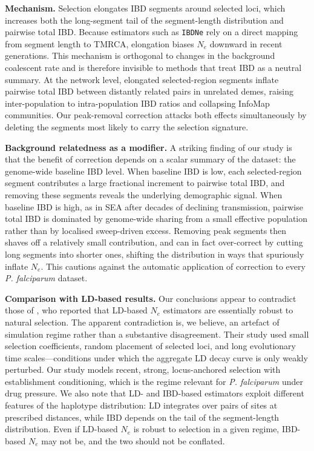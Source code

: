 \documentclass[11pt]{article}
\begin{document}
\textbf{Mechanism.} Selection elongates IBD segments around selected loci, which increases both the long-segment tail of the segment-length distribution and pairwise total IBD. Because estimators such as \texttt{IBDNe} rely on a direct mapping from segment length to TMRCA, elongation biases $N_e$ downward in recent generations. This mechanism is orthogonal to changes in the background coalescent rate and is therefore invisible to methods that treat IBD as a neutral summary. At the network level, elongated selected-region segments inflate pairwise total IBD between distantly related pairs in unrelated demes, raising inter-population to intra-population IBD ratios and collapsing InfoMap communities. Our peak-removal correction attacks both effects simultaneously by deleting the segments most likely to carry the selection signature.

\textbf{Background relatedness as a modifier.} A striking finding of our study is that the benefit of correction depends on a scalar summary of the dataset: the genome-wide baseline IBD level. When baseline IBD is low, each selected-region segment contributes a large fractional increment to pairwise total IBD, and removing these segments reveals the underlying demographic signal. When baseline IBD is high, as in SEA after decades of declining transmission, pairwise total IBD is dominated by genome-wide sharing from a small effective population rather than by localised sweep-driven excess. Removing peak segments then shaves off a relatively small contribution, and can in fact over-correct by cutting long segments into shorter ones, shifting the distribution in ways that spuriously inflate $N_e$. This cautions against the automatic application of correction to every \textit{P. falciparum} dataset.

\textbf{Comparison with LD-based results.} Our conclusions appear to contradict those of \citet{novo2022ld}, who reported that LD-based $N_e$ estimators are essentially robust to natural selection. The apparent contradiction is, we believe, an artefact of simulation regime rather than a substantive disagreement. Their study used small selection coefficients, random placement of selected loci, and long evolutionary time scales—conditions under which the aggregate LD decay curve is only weakly perturbed. Our study models recent, strong, locus-anchored selection with establishment conditioning, which is the regime relevant for \textit{P. falciparum} under drug pressure. We also note that LD- and IBD-based estimators exploit different features of the haplotype distribution: LD integrates over pairs of sites at prescribed distances, while IBD depends on the tail of the segment-length distribution. Even if LD-based $N_e$ is robust to selection in a given regime, IBD-based $N_e$ may not be, and the two should not be conflated.
\end{document}
